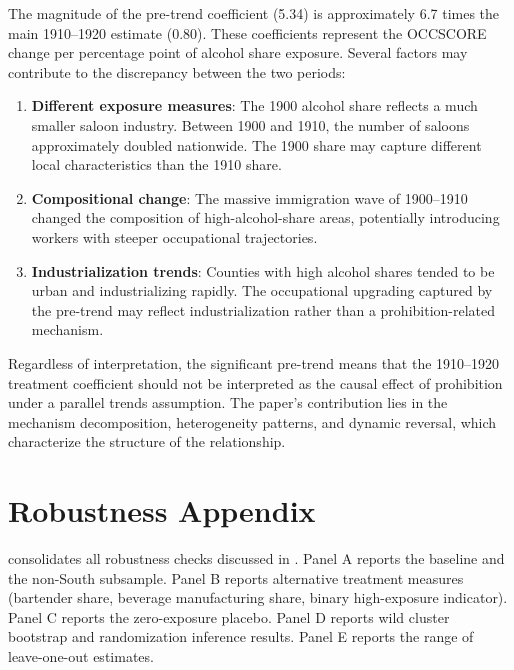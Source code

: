 \documentclass[12pt]{article}
\begin{document}
\begin{table}[H]
\centering
\caption{Earlier-Period Comparison: 1900--1910}
\label{tab:pretrend}

\end{table}

The magnitude of the pre-trend coefficient (5.34) is approximately 6.7 times the main 1910--1920 estimate (0.80). These coefficients represent the OCCSCORE change per percentage point of alcohol share exposure. Several factors may contribute to the discrepancy between the two periods:

\begin{enumerate}
    \item \textbf{Different exposure measures}: The 1900 alcohol share reflects a much smaller saloon industry. Between 1900 and 1910, the number of saloons approximately doubled nationwide. The 1900 share may capture different local characteristics than the 1910 share.
    \item \textbf{Compositional change}: The massive immigration wave of 1900--1910 changed the composition of high-alcohol-share areas, potentially introducing workers with steeper occupational trajectories.
    \item \textbf{Industrialization trends}: Counties with high alcohol shares tended to be urban and industrializing rapidly. The occupational upgrading captured by the pre-trend may reflect industrialization rather than a prohibition-related mechanism.
\end{enumerate}

Regardless of interpretation, the significant pre-trend means that the 1910--1920 treatment coefficient should not be interpreted as the causal effect of prohibition under a parallel trends assumption. The paper's contribution lies in the mechanism decomposition, heterogeneity patterns, and dynamic reversal, which characterize the structure of the relationship.


\section{Robustness Appendix}
\label{app:robustness}

 consolidates all robustness checks discussed in . Panel A reports the baseline and the non-South subsample. Panel B reports alternative treatment measures (bartender share, beverage manufacturing share, binary high-exposure indicator). Panel C reports the zero-exposure placebo. Panel D reports wild cluster bootstrap and randomization inference results. Panel E reports the range of leave-one-out estimates.
\end{document}
